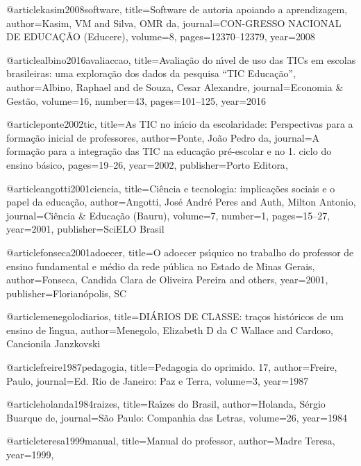 @article{kasim2008software,
	title={Software de autoria apoiando a aprendizagem},
	author={Kasim, VM and Silva, OMR da},
	journal={CON-GRESSO NACIONAL DE EDUCA{\c{C}}{\~A}O (Educere)},
	volume={8},
	pages={12370--12379},
	year={2008}
}

@article{albino2016avaliaccao,
	title={Avalia{\c{c}}{\~a}o do n{\'\i}vel de uso das TICs em escolas brasileiras: uma explora{\c{c}}{\~a}o dos dados da pesquisa “TIC Educa{\c{c}}{\~a}o”},
	author={Albino, Raphael and de Souza, Cesar Alexandre},
	journal={Economia \& Gest{\~a}o},
	volume={16},
	number={43},
	pages={101--125},
	year={2016}
}

@article{ponte2002tic,
	title={As TIC no in{\'\i}cio da escolaridade: Perspectivas para a forma{\c{c}}{\~a}o inicial de professores},
	author={Ponte, Jo{\~a}o Pedro da},
	journal={A forma{\c{c}}{\~a}o para a integra{\c{c}}{\~a}o das TIC na educa{\c{c}}{\~a}o pr{\'e}-escolar e no 1. {\textordmasculine} ciclo do ensino b{\'a}sico},
	pages={19--26},
	year={2002},
	publisher={Porto Editora},
}

@article{angotti2001ciencia,
	title={Ci{\^e}ncia e tecnologia: implica{\c{c}}{\~o}es sociais e o papel da educa{\c{c}}{\~a}o},
	author={Angotti, Jos{\'e} Andr{\'e} Peres and Auth, Milton Antonio},
	journal={Ci{\^e}ncia \& Educa{\c{c}}{\~a}o (Bauru)},
	volume={7},
	number={1},
	pages={15--27},
	year={2001},
	publisher={SciELO Brasil}
}

@article{fonseca2001adoecer,
	title={O adoecer ps{\'\i}quico no trabalho do professor de ensino fundamental e m{\'e}dio da rede p{\'u}blica no Estado de Minas Gerais},
	author={Fonseca, Candida Clara de Oliveira Pereira and others},
	year={2001},
	publisher={Florian{\'o}polis, SC}
}

@article{menegolodiarios,
	title={DI{\'A}RIOS DE CLASSE: tra{\c{c}}os hist{\'o}ricos de um ensino de l{\'\i}ngua},
	author={Menegolo, Elizabeth D da C Wallace and Cardoso, Cancionila Janzkovski}
}

@article{freire1987pedagogia,
	title={Pedagogia do oprimido. 17{\textordfeminine}},
	author={Freire, Paulo},
	journal={Ed. Rio de Janeiro: Paz e Terra},
	volume={3},
	year={1987}
}

@article{holanda1984raizes,
	title={Ra{\'\i}zes do Brasil},
	author={Holanda, S{\'e}rgio Buarque de},
	journal={S{\~a}o Paulo: Companhia das Letras},
	volume={26},
	year={1984}
}

@article{teresa1999manual,
	title={Manual do professor},
	author={Madre Teresa},
	year={1999},
}

